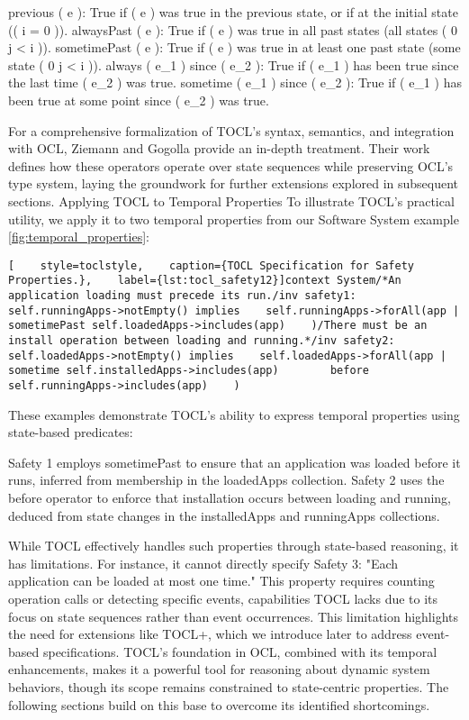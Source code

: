 previous ( e ): True if ( e ) was true in the previous state, or if at the initial state (( i = 0 )).
alwaysPast ( e ): True if ( e ) was true in all past states (all states ( 0 \leq j < i )).
sometimePast ( e ): True if ( e ) was true in at least one past state (some state ( 0 \leq j < i )).
always ( e_1 ) since ( e_2 ): True if ( e_1 ) has been true since the last time ( e_2 ) was true.
sometime ( e_1 ) since ( e_2 ): True if ( e_1 ) has been true at some point since ( e_2 ) was true.

For a comprehensive formalization of TOCL’s syntax, semantics, and integration with OCL, Ziemann and Gogolla \cite{TOCL} provide an in-depth treatment. Their work defines how these operators operate over state sequences while preserving OCL’s type system, laying the groundwork for further extensions explored in subsequent sections.
Applying TOCL to Temporal Properties
To illustrate TOCL’s practical utility, we apply it to two temporal properties from our Software System example \ref{fig:temporal_properties}:
\begin{lstlisting}[    style=toclstyle,    caption={TOCL Specification for Safety Properties.},    label={lst:tocl_safety12}]context System/*An application loading must precede its run./inv safety1:    self.runningApps->notEmpty() implies    self.runningApps->forAll(app |        sometimePast self.loadedApps->includes(app)    )/There must be an install operation between loading and running.*/inv safety2:    self.loadedApps->notEmpty() implies    self.loadedApps->forAll(app |        sometime self.installedApps->includes(app)        before self.runningApps->includes(app)    )\end{lstlisting}
These examples demonstrate TOCL’s ability to express temporal properties using state-based predicates:

Safety 1 employs sometimePast to ensure that an application was loaded before it runs, inferred from membership in the loadedApps collection.
Safety 2 uses the before operator to enforce that installation occurs between loading and running, deduced from state changes in the installedApps and runningApps collections.

While TOCL effectively handles such properties through state-based reasoning, it has limitations. For instance, it cannot directly specify Safety 3: "Each application can be loaded at most one time." This property requires counting operation calls or detecting specific events, capabilities TOCL lacks due to its focus on state sequences rather than event occurrences. This limitation highlights the need for extensions like TOCL+, which we introduce later to address event-based specifications.
TOCL’s foundation in OCL, combined with its temporal enhancements, makes it a powerful tool for reasoning about dynamic system behaviors, though its scope remains constrained to state-centric properties. The following sections build on this base to overcome its identified shortcomings.



